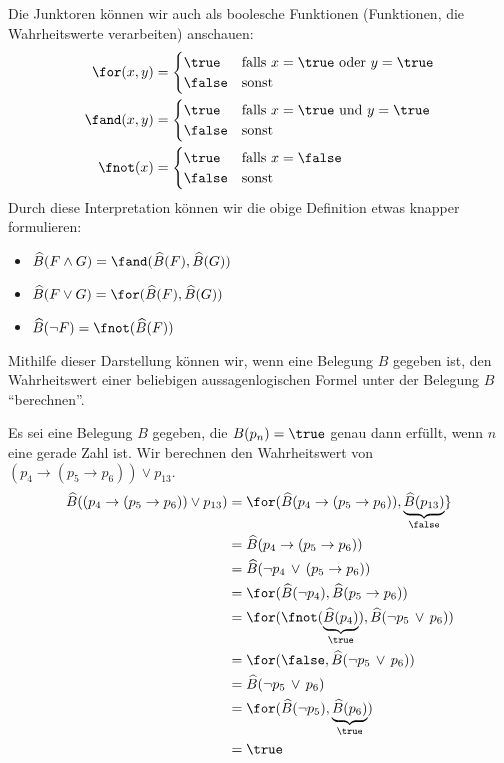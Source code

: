 \begin{remark}
    Die Junktoren können wir auch als boolesche Funktionen (Funktionen, die
    Wahrheitswerte verarbeiten) anschauen:
    \begin{align*}
        \for(x,y) &= \begin{cases}
            \true&\text{falls }x=\true\text{ oder }y=\true\\
            \false&\text{sonst}
        \end{cases}\\
        \fand(x,y) &= \begin{cases}
            \true&\text{falls }x=\true\text{ und }y=\true\\
            \false&\text{sonst}
        \end{cases}\\
        \fnot(x) &=\begin{cases}
            \true&\text{falls }x=\false\\
            \false&\text{sonst}
        \end{cases}
    \end{align*}
    Durch diese Interpretation können wir die obige Definition etwas knapper formulieren:
    \begin{itemize}
        \item $\widehat{B}(F\land G)=\fand(\widehat{B}(F),\widehat{B}(G))$
        \item $\widehat{B}(F\lor G)=\for(\widehat{B}(F),\widehat{B}(G))$
        \item $\widehat{B}(\neg F)=\fnot(\widehat{B}(F))$
    \end{itemize}
    Mithilfe dieser Darstellung können wir, wenn eine Belegung $B$ gegeben ist, den Wahrheitswert einer beliebigen aussagenlogischen Formel unter der Belegung $B$ ``berechnen''.
\end{remark}

\begin{example}
    Es sei eine Belegung $B$ gegeben, die $B(p_n)=\true$ genau dann erfüllt, wenn $n$ eine
    gerade Zahl ist. Wir berechnen den Wahrheitswert von $(p_4\to(p_5\to p_6))\lor p_{13}.$
    \tcblower
    \begin{align*}
        \widehat{B}((p_4\to(p_5\to p_6))\lor p_{13})&=\for(\widehat{B}(p_4\to(p_5\to p_6)),
        \underbrace{\widehat{B}(p_{13})}_{\false}\}\\
        &=\widehat{B}(p_4\to(p_5\to p_6))\\
        &=\widehat{B}(\neg p_4\,\lor\,(p_5\to p_6))\\
        &=\for(\widehat{B}(\neg p_4),\widehat{B}(p_5\to p_6))\\
        &=\for( \fnot(\underbrace{\widehat{B}( p_4)}_{\true}),\widehat{B}(\neg p_5\,\lor\,
        p_6))\\
        &=\for( \false,\widehat{B}(\neg p_5\,\lor\,
        p_6))\\
        &=\widehat{B}(\neg p_5\,\lor\, p_6)\\
        &=\for(\widehat{B}(\neg p_5),\underbrace{\widehat{B}(p_6)}_{\true})\\
        &=\true
    \end{align*}
\end{example}

